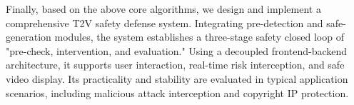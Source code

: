 Finally, based on the above core algorithms, we design and implement a comprehensive T2V safety defense system. Integrating pre-detection and safe-generation modules, the system establishes a three-stage safety closed loop of "pre-check, intervention, and evaluation." Using a decoupled frontend-backend architecture, it supports user interaction, real-time risk interception, and safe video display. Its practicality and stability are evaluated in typical application scenarios, including malicious attack interception and copyright IP protection.


\pagestyle{enfrontmatterstyle}%
\cleardoublepage\pagestyle{frontmatterstyle}%

